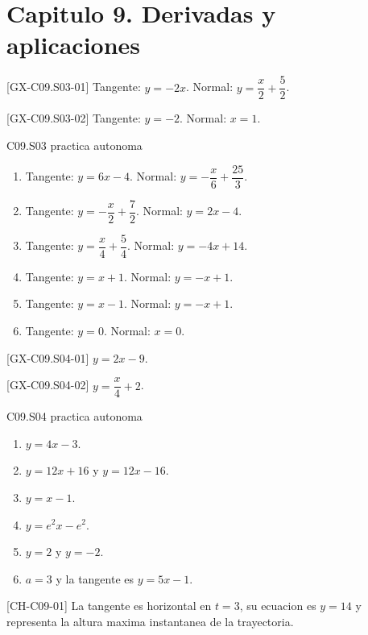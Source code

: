 \setcounter{chapter}{8}
\section*{Capitulo 9. Derivadas y aplicaciones}

\begin{shortanswer}{[GX-C09.S03-01]}
Tangente: \(y=-2x\). Normal: \(y=\dfrac{x}{2}+\dfrac{5}{2}\).
\end{shortanswer}

\begin{shortanswer}{[GX-C09.S03-02]}
Tangente: \(y=-2\). Normal: \(x=1\).
\end{shortanswer}

\begin{shortanswer}{C09.S03 practica autonoma}
\begin{enumerate}[label=\textbf{PX-C09.S03-\arabic*:}, leftmargin=*]
  \item Tangente: \(y=6x-4\). Normal: \(y=-\dfrac{x}{6}+\dfrac{25}{3}\).
  \item Tangente: \(y=-\dfrac{x}{2}+\dfrac{7}{2}\). Normal: \(y=2x-4\).
  \item Tangente: \(y=\dfrac{x}{4}+\dfrac{5}{4}\). Normal: \(y=-4x+14\).
  \item Tangente: \(y=x+1\). Normal: \(y=-x+1\).
  \item Tangente: \(y=x-1\). Normal: \(y=-x+1\).
  \item Tangente: \(y=0\). Normal: \(x=0\).
\end{enumerate}
\end{shortanswer}

\begin{shortanswer}{[GX-C09.S04-01]}
\(y=2x-9\).
\end{shortanswer}

\begin{shortanswer}{[GX-C09.S04-02]}
\(y=\dfrac{x}{4}+2\).
\end{shortanswer}

\begin{shortanswer}{C09.S04 practica autonoma}
\begin{enumerate}[label=\textbf{PX-C09.S04-\arabic*:}, leftmargin=*]
  \item \(y=4x-3\).
  \item \(y=12x+16\) y \(y=12x-16\).
  \item \(y=x-1\).
  \item \(y=e^2x-e^2\).
  \item \(y=2\) y \(y=-2\).
  \item \(a=3\) y la tangente es \(y=5x-1\).
\end{enumerate}
\end{shortanswer}

\begin{shortanswer}{[CH-C09-01]}
La tangente es horizontal en \(t=3\), su ecuacion es \(y=14\) y representa la altura maxima
instantanea de la trayectoria.
\end{shortanswer}

